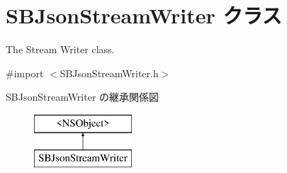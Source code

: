 \hypertarget{interface_s_b_json_stream_writer}{}\section{S\+B\+Json\+Stream\+Writer クラス}
\label{interface_s_b_json_stream_writer}


The Stream Writer class.  




{\ttfamily \#import $<$S\+B\+Json\+Stream\+Writer.\+h$>$}

S\+B\+Json\+Stream\+Writer の継承関係図\begin{figure}[H]
\begin{center}
\leavevmode
\includegraphics[height=2.000000cm]{interface_s_b_json_stream_writer}
\end{center}
\end{figure}
